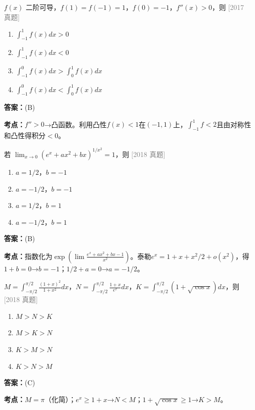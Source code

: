 \documentclass[12pt,a4paper]{ctexbook}
\newcommand{\src}[1]{\hfill\textcolor{gray}{\small\textsf{[#1]}}}
\newcommand{\ans}[1]{\begin{answerbox}\textbf{答案：}#1\end{answerbox}}
\newcommand{\kpt}[1]{\textbf{考点：}#1}
\begin{document}
\begin{exercise}
$f(x)$ 二阶可导，$f(1)=f(-1)=1$，$f(0)=-1$，$f''(x)>0$，则 \hfill\src{2017 真题}
\begin{enumerate}[label=(\Alph*),nosep]
  \item $\int_{-1}^1 f(x)dx>0$
  \item $\int_{-1}^1 f(x)dx<0$
  \item $\int_{-1}^0 f(x)dx>\int_0^1 f(x)dx$
  \item $\int_{-1}^0 f(x)dx<\int_0^1 f(x)dx$
\end{enumerate}
\end{exercise}
\ans{(B)}
\kpt{$f''>0$→凸函数。利用凸性$f(x)<1$在$(-1,1)$上，$\int_{-1}^1 f<2$且由对称性和凸性得积分$<0$。}

\bigskip

\begin{exercise}
若 $\lim_{x\to 0}(e^x+ax^2+bx)^{1/x^2}=1$，则 \hfill\src{2018 真题}
\begin{enumerate}[label=(\Alph*),nosep]
  \item $a=1/2$，$b=-1$
  \item $a=-1/2$，$b=-1$
  \item $a=1/2$，$b=1$
  \item $a=-1/2$，$b=1$
\end{enumerate}
\end{exercise}
\ans{(B)}
\kpt{指数化为$\exp(\lim\frac{e^x+ax^2+bx-1}{x^2})$。泰勒$e^x=1+x+x^2/2+o(x^2)$，得$1+b=0$→$b=-1$；$1/2+a=0$→$a=-1/2$。}

\bigskip

\begin{exercise}
$M=\int_{-\pi/2}^{\pi/2}\frac{(1+x)^2}{1+x^2}dx$，$N=\int_{-\pi/2}^{\pi/2}\frac{1+x}{e^x}dx$，$K=\int_{-\pi/2}^{\pi/2}(1+\sqrt{\cos x})dx$，则 \hfill\src{2018 真题}
\begin{enumerate}[label=(\Alph*),nosep]
  \item $M>N>K$
  \item $M>K>N$
  \item $K>M>N$
  \item $K>N>M$
\end{enumerate}
\end{exercise}
\ans{(C)}
\kpt{$M=\pi$（化简）；$e^x\geqslant 1+x$→$N<M$；$1+\sqrt{\cos x}\geqslant 1$→$K>M$。}

\bigskip
\end{document}
